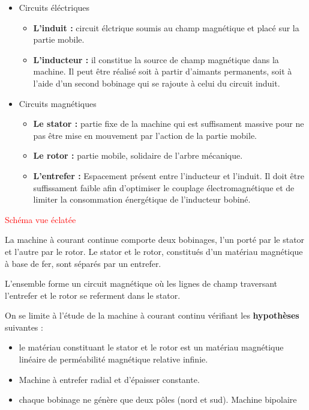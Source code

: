 \documentclass[12pt,prb,aps,epsf]{article}
\begin{document}
\begin{itemize}
    \item Circuits éléctriques
    \begin{itemize}
        \item \textbf{L'induit :} circuit élctrique soumis au champ magnétique et placé sur la partie mobile.
        \item \textbf{L'inducteur :} il constitue la source de champ magnétique dans la machine. Il peut être réalisé soit à partir d'aimants permanents, soit à l'aide d'un second bobinage qui se rajoute à celui du circuit induit. 
    \end{itemize}
    \item Circuits magnétiques
    \begin{itemize}
        \item \textbf{Le stator :} partie fixe de la machine qui est suffisament massive pour ne pas être mise en mouvement par l'action de la partie mobile.
        \item \textbf{Le rotor :} partie mobile, solidaire de l'arbre mécanique.
        \item \textbf{L'entrefer :} Espacement présent entre l'inducteur et l'induit. Il doit être suffissament faible afin d'optimiser le couplage électromagnétique et de limiter la consommation énergétique de l'inducteur bobiné.
    \end{itemize}
\end{itemize}


\textcolor{red}{Schéma vue éclatée}


La machine à courant continue comporte deux bobinages, l'un porté par le stator et l'autre par le rotor. Le stator et le rotor, constitués d'un matériau magnétique à base de fer, sont séparés par un entrefer.\medskip

L'ensemble forme un circuit magnétique où les lignes de champ traversant l'entrefer et le rotor se referment dans le stator.\medskip

On se limite à l'étude de la machine à courant continu vérifiant les \textbf{hypothèses} suivantes :

\begin{itemize}
    \item le matériau constituant le stator et le rotor est un matériau magnétique linéaire de perméabilité magnétique relative infinie.
    \item Machine à entrefer radial et d'épaisser constante.
    \item chaque bobinage ne génère que deux pôles (nord et sud). Machine bipolaire
    
\end{itemize}
\end{document}
